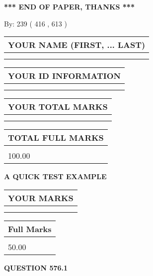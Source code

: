 \documentclass[12pt]{article}
\begin{document}
\vspace{1.0in} 
{\textbf{\large{ *** END OF PAPER, THANKS *** }}} 
   
   
\hspace{1.0in} By: 
 239 ( 416 ,  613 )
   
   
   
   
\newpage 
\setcounter{page}{ 
   576001 } 
   
   
   
   
\noindent\begin{tabular}{|l|}
\hline
YOUR NAME (FIRST, ... LAST)  \\
\hline
 \\ 
 \\ 
\hline
\end{tabular}
\hspace{0.05in} \begin{tabular}{|l|}
\hline
 YOUR   ID   INFORMATION  \\
\hline
 \\ 
 \\ 
\hline
\end{tabular}
   
   
\vspace{0.2in}\noindent\begin{tabular}{|l|}
\hline
YOUR TOTAL MARKS  \\
\hline
 \\ 
 \\ 
\hline
\end{tabular}
\hspace{0.05in} \begin{tabular}{|l|}
\hline
TOTAL FULL MARKS  \\
\hline
 \\ 
100.00 \\
\hline
\end{tabular}
   
   
 \vspace{0.2in}
{\LARGE {\textbf{ A QUICK TEST EXAMPLE}}}
   
   
  
\vspace{0.2in}
  
\noindent\begin{tabular}{|l|}
\hline
 YOUR MARKS  \\
\hline
 \\ 
 \\ 
\hline
\end{tabular}
\hspace{0.05in} \begin{tabular}{|l|}
\hline
 Full Marks  \\
\hline
 \\ 
50.00 \\
\hline
\end{tabular}
{\textbf{\Large{QUESTION
576.1 
}}}
  
\end{document}
